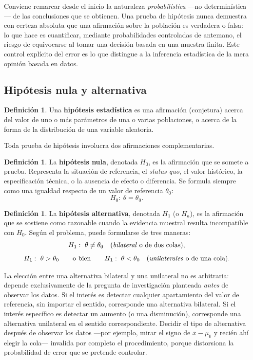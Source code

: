 \documentclass[11pt,a4paper]{article}
\theoremstyle{plain}
\theoremstyle{definition}
\newtheorem{definicion}[teorema]{Definición}
\theoremstyle{remark}
\begin{document}
Conviene remarcar desde el inicio la naturaleza \emph{probabilística} —no determinística— de las conclusiones que se obtienen. Una prueba de hipótesis nunca demuestra con certeza absoluta que una afirmación sobre la población es verdadera o falsa: lo que hace es cuantificar, mediante probabilidades controladas de antemano, el riesgo de equivocarse al tomar una decisión basada en una muestra finita. Este control explícito del error es lo que distingue a la inferencia estadística de la mera opinión basada en datos.

\subsection{Hipótesis nula y alternativa}

\begin{definicion}
Una \textbf{hipótesis estadística} es una afirmación (conjetura) acerca del valor de uno o más parámetros de una o varias poblaciones, o acerca de la forma de la distribución de una variable aleatoria.
\end{definicion}

Toda prueba de hipótesis involucra dos afirmaciones complementarias.

\begin{definicion}
La \textbf{hipótesis nula}, denotada $H_0$, es la afirmación que se somete a prueba. Representa la situación de referencia, el \emph{status quo}, el valor histórico, la especificación técnica, o la ausencia de efecto o diferencia. Se formula siempre como una igualdad respecto de un valor de referencia $\theta_0$:
\[
H_0:\ \theta=\theta_0.
\]
\end{definicion}

\begin{definicion}
La \textbf{hipótesis alternativa}, denotada $H_1$ (o $H_a$), es la afirmación que se sostiene como razonable cuando la evidencia muestral resulta incompatible con $H_0$. Según el problema, puede formularse de tres maneras:
\[
H_1:\ \theta\neq\theta_0 \quad \text{(\emph{bilateral} o de dos colas)},
\]
\[
H_1:\ \theta>\theta_0 \qquad \text{o bien} \qquad H_1:\ \theta<\theta_0 \quad \text{(\emph{unilaterales} o de una cola)}.
\]
\end{definicion}

La elección entre una alternativa bilateral y una unilateral no es arbitraria: depende exclusivamente de la pregunta de investigación planteada \emph{antes} de observar los datos. Si el interés es detectar cualquier apartamiento del valor de referencia, sin importar el sentido, corresponde una alternativa bilateral. Si el interés específico es detectar un aumento (o una disminución), corresponde una alternativa unilateral en el sentido correspondiente. Decidir el tipo de alternativa después de observar los datos —por ejemplo, mirar el signo de $\overline{x}-\mu_0$ y recién ahí elegir la cola— invalida por completo el procedimiento, porque distorsiona la probabilidad de error que se pretende controlar.
\end{document}
